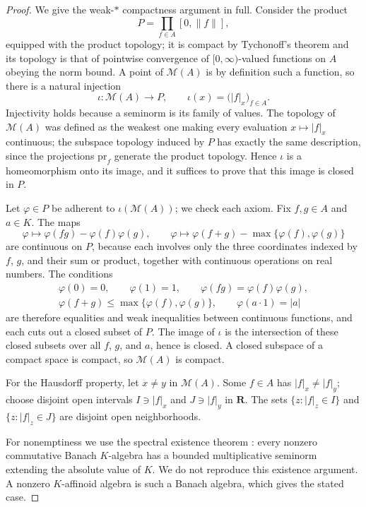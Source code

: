 \begin{proof}
We give the weak-$*$ compactness argument in full.  Consider the product
\[
                     P=\prod_{f\in A}[0,\|f\|],
\]
equipped with the product topology; it is compact by Tychonoff's theorem
\cite[Chapter~5]{Kel75} and its topology is that of pointwise convergence
of $[0,\infty)$-valued functions on $A$ obeying the norm bound.  A
point of $\mathcal M(A)$ is by definition such a function, so there is a
natural injection
\[
 \iota:\mathcal M(A)\longrightarrow P,
 \qquad
 \iota(x)=\bigl(|f|_x\bigr)_{f\in A}.
\]
Injectivity holds because a seminorm is its family of values.  The
topology of $\mathcal M(A)$ was defined as the weakest one making every
evaluation $x\mapsto|f|_x$ continuous; the subspace topology induced by
$P$ has exactly the same description, since the projections
$\mathrm{pr}_f$ generate the product topology.  Hence $\iota$ is a
homeomorphism onto its image, and it suffices to prove that this image is
closed in $P$.

Let $\varphi\in P$ be adherent to $\iota(\mathcal M(A))$; we check
each axiom.  Fix $f,g\in A$ and $a\in K$.  The maps
\[
 \varphi\longmapsto\varphi(fg)-\varphi(f)\varphi(g),
 \qquad
 \varphi\longmapsto\varphi(f+g)-\max\{\varphi(f),\varphi(g)\}
\]
are continuous on $P$, because each involves only the three coordinates
indexed by $f$, $g$, and their sum or product, together with
 continuous operations on real numbers.  The conditions
 \[
 \begin{gathered}
 \varphi(0)=0,\qquad \varphi(1)=1,
 \qquad \varphi(fg)=\varphi(f)\varphi(g),\\
 \varphi(f+g)\leq\max\{\varphi(f),\varphi(g)\},
 \qquad \varphi(a\cdot1)=|a|
 \end{gathered}
 \]
are therefore equalities and weak inequalities between continuous
functions, and each cuts out a closed subset of $P$.  The image of
$\iota$ is the intersection of these closed subsets over all $f$,
$g$, and $a$, hence is closed.  A closed subspace of a compact space
is compact, so $\mathcal M(A)$ is compact.

For the Hausdorff property, let $x\neq y$ in $\mathcal M(A)$.  Some
$f\in A$ has $|f|_x\neq|f|_y$; choose disjoint open intervals
$I\ni|f|_x$ and $J\ni|f|_y$ in $\mathbf R$.  The sets
$\{z:|f|_z\in I\}$ and $\{z:|f|_z\in J\}$ are disjoint open
neighborhoods.

For nonemptiness we use the spectral existence theorem
\cite[Theorem~1.2.1]{Berk12}: every nonzero commutative Banach $K$-algebra
has a bounded multiplicative seminorm extending the absolute value of $K$.
We do not reproduce this existence argument. A nonzero $K$-affinoid
algebra is such a Banach algebra, which gives the stated case.
\end{proof}

